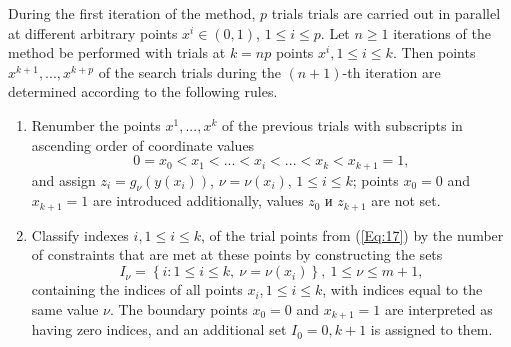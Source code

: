 \documentclass[
11pt,%
tightenlines,%
twoside,%
onecolumn,%
nofloats,%
nobibnotes,%
nofootinbib,%
superscriptaddress,%
noshowpacs,%
centertags]%
{revtex4}
\begin{document}
During the first iteration of the method, $p$ trials trials are carried out in parallel at different arbitrary points $x^i\in(0,1)$, $1\leq i \leq p$.
Let $n\geq 1$ iterations of the method be performed with trials at $k=np$ points $x^i, 1\leq i \leq k$. Then points $x^{k+1},...,x^{k+p}$ of the search trials during the $(n+1)$-th iteration are determined according to the following rules.

\begin{enumerate}
\item 
Renumber the points $x^1,...,x^k$ of the previous trials with subscripts in ascending order of coordinate values
\begin{equation}\label{Eq:17}
0=x_0<x_1<...<x_i<...<x_k<x_{k+1}=1,
\end{equation}
and assign $z_i=g_\nu(y(x_i))$, $\nu=\nu(x_i)$, $1 \leq i \leq k$; points $x_0=0$ and $x_{k+1}=1$ are introduced additionally, values $z_0$ и $z_{k+1}$ are not set.
\item
Classify indexes  $i,1\leq i \leq k$, of the trial points from  (\ref{Eq:17}) by the number of constraints that are met at these points by constructing the sets
\begin{equation}\label{Eq:18}
I_\nu = \left\{i: 1 \leq i \leq k,\ \nu = \nu(x_i)\right\},\ 1 \leq \nu \leq m+1,
\end{equation}
containing the indices of all points $x_i,1\leq i \leq k$, with indices equal to the same value $\nu$. The boundary points $x_0=0$ and $x_{k+1}=1$ are interpreted as having zero indices, and an additional set $I_0={0,k+1}$ is assigned to them. 


\end{enumerate}
\end{document}
